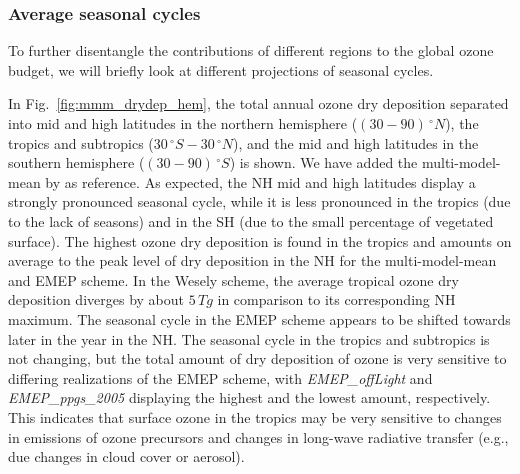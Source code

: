 \documentclass[gmd, manuscript]{copernicus}
\begin{document}
\subsubsection{Average seasonal cycles}
\label{subsubsec:seasons}
%
To further disentangle the contributions of different regions to the global ozone budget, we will briefly look at different projections of seasonal cycles.

In Fig.~\ref{fig:mmm_drydep_hem}, the total annual ozone dry deposition separated into mid and high latitudes in the northern hemisphere ($(30-90)\,\unit{^\circ N}$), the tropics and subtropics ($30\,\unit{^\circ S}-30\,\unit{^\circ N}$), and the mid and high latitudes in the southern hemisphere ($(30-90)\,\unit{^\circ S}$) is shown. We have added the multi-model-mean by \citet{ACP:Hardacre2015} as reference. As expected, the NH mid and high latitudes display a strongly pronounced seasonal cycle, while it is less pronounced in the tropics (due to the lack of seasons) and in the SH (due to the small percentage of vegetated surface). The highest ozone dry deposition is found in the tropics and amounts on average to the  peak level of dry deposition in the NH for the multi-model-mean \citep{ACP:Hardacre2015} and EMEP scheme. In the Wesely scheme, the average tropical ozone dry deposition diverges by about $5\,\unit{Tg}$ in comparison to its corresponding NH maximum. The seasonal cycle in the EMEP scheme appears to be shifted towards later in the year in the NH. The seasonal cycle in the tropics and subtropics is not changing, but the total amount of dry deposition of ozone is very sensitive to differing realizations of the EMEP scheme, with \emph{EMEP\_offLight} and \emph{EMEP\_ppgs\_2005} displaying the highest and the lowest amount, respectively. This indicates that surface ozone in the tropics may be very sensitive to changes in emissions of ozone precursors and changes in long-wave radiative transfer (e.g., due changes in cloud cover or aerosol).
\end{document}
